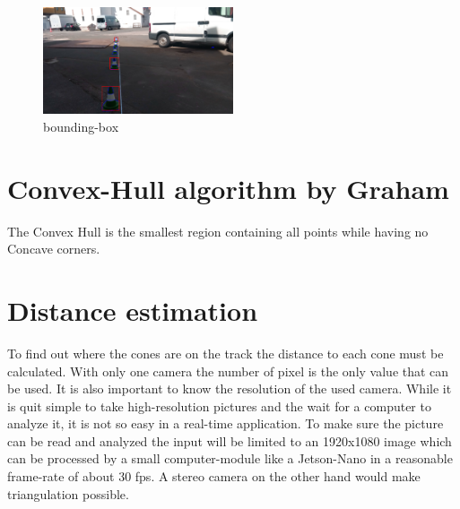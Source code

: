 \documentclass[10pt,a4paper]{article}
\begin{document}
	\begin{figure}[h]
		\centering
		\includegraphics[width=0.5\textwidth]{Abb/bounding-box.png}
		\caption{bounding-box}
		\label{bounding-box}
	\end{figure}
	
	\section{Convex-Hull algorithm by Graham} \label{convex-hull}
	The Convex Hull is the smallest region containing all points while having no Concave corners.
	
	\section{Distance estimation}
	To find out where the cones are on the track the distance to each cone must be calculated. 
	With only one camera the number of pixel is the only value that can be used. It is also important to know the resolution of the used camera.
	While it is quit simple to take high-resolution pictures and the wait for a computer to analyze it, it is not so easy in a real-time application. To make sure the picture can be read and analyzed the input will be limited to an 1920x1080 image which can be processed by a small computer-module like a Jetson-Nano in a reasonable frame-rate of about 30 fps.
	A stereo camera on the other hand would make triangulation possible.
\end{document}
